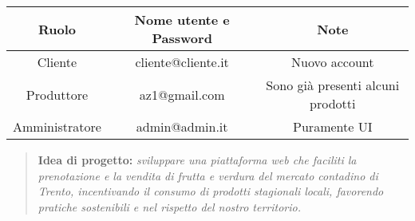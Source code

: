 \documentclass{scrartcl}
\begin{document}
\begin{table}[h!]
    \renewcommand{\arraystretch}{1.2} 
    \centering
    \begin{tabular}{c|c|c}
        \textbf{Ruolo} & \textbf{Nome utente e Password} & \textbf{Note}\\
        \hline
        Cliente & cliente@cliente.it & Nuovo account\\
        Produttore& az1@gmail.com & Sono già presenti alcuni prodotti\\
        Amministratore & admin@admin.it & Puramente UI
    \end{tabular}
\end{table}

\vspace{1.7cm}
\begin{abstract}
    \centering
    \noindent
    \textbf{Idea di progetto:} \textit{sviluppare una piattaforma web che faciliti la prenotazione e la vendita di frutta e verdura del mercato contadino di Trento, incentivando il consumo di prodotti stagionali locali, favorendo pratiche sostenibili e nel rispetto del nostro territorio.}
\end{abstract}






\end{document}
